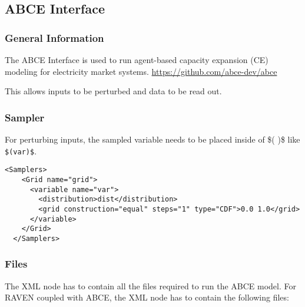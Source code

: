 \subsection{ABCE Interface}
\label{subsec:AbceInterface}

\subsubsection{General Information}
The ABCE Interface is used to run agent-based 
capacity expansion (CE) modeling for electricity market systems. 
\url{https://github.com/abce-dev/abce}

This allows inputs to be perturbed and data to be read out.

\subsubsection{Sampler}

For perturbing inputs, the sampled variable needs to be placed inside
of \$( )\$ like \verb'$(var)$'. 

\begin{lstlisting}[style=XML]
  <Samplers>
    <Grid name="grid">
      <variable name="var">
        <distribution>dist</distribution>
        <grid construction="equal" steps="1" type="CDF">0.0 1.0</grid>
      </variable>
    </Grid>
  </Samplers>
\end{lstlisting}


\subsubsection{Files}

The  XML node has to contain all the files required to run
the ABCE model. 
For RAVEN coupled with ABCE, the  XML node has to contain
the following files:

